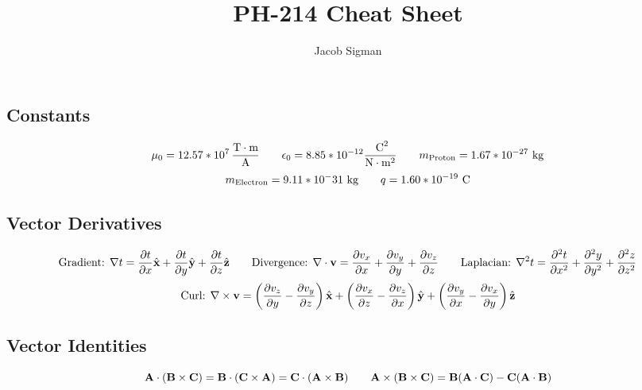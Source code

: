 \documentclass{article}
\title{PH-214 Cheat Sheet}
\author{Jacob Sigman}
\date{}
\begin{document}
\maketitle

\subsection*{Constants}
\[\mu_0=12.57*10^7\,\frac{\textnormal{T}\cdot\textnormal{m}}{\textnormal{A}}\hspace{7 mm}\epsilon_0=8.85*10^{-12}\frac{\textnormal{ C}^2}{\textnormal{N}\cdot\textnormal{m}^2}\hspace{7 mm}m_{\textnormal{Proton}}=1.67*10^{-27}\textnormal{ kg}\]
\[m_{\textnormal{Electron}}=9.11*10^-31\textnormal{ kg}\hspace{7 mm}q=1.60*10^{-19} \textnormal{ C}\]
\subsection*{Vector Derivatives}
\[\textnormal{Gradient: }\nabla t = \frac{\partial t}{\partial x}\hat{\textbf{x}}+\frac{\partial t}{\partial y}\hat{\textbf{y}}+\frac{\partial t}{\partial z}\hat{\textbf{z}}\hspace{7 mm}\textnormal{Divergence: }\nabla\cdot \textbf{v}=\frac{\partial v_x}{\partial x}+\frac{\partial v_y}{\partial y}+\frac{\partial v_z}{\partial z}\hspace{7 mm}\textnormal{Laplacian: }\nabla^2t=\frac{\partial^2t}{\partial x^2}+\frac{\partial^2y}{\partial y^2}+\frac{\partial^2z}{\partial z^2}\]
\[\textnormal{Curl: }\nabla\times \textbf{v} = \left(\frac{\partial v_z}{\partial y}-\frac{\partial v_y}{\partial z}\right)\hat{\textbf{x}}+\left(\frac{\partial v_x}{\partial z}-\frac{\partial v_z}{\partial x}\right)\hat{\textbf{y}}+\left(\frac{\partial v_y}{\partial x}-\frac{\partial v_x}{\partial y}\right)\hat{\textbf{z}}\]
\subsection*{Vector Identities}
\[\textbf{A}\cdot(\textbf{B}\times\textbf{C})=\textbf{B}\cdot(\textbf{C}\times\textbf{A})=\textbf{C}\cdot(\textbf{A}\times\textbf{B})\hspace{7 mm}\textbf{A}\times(\textbf{B}\times\textbf{C})=\textbf{B}(\textbf{A}\cdot\textbf{C})-\textbf{C}(\textbf{A}\cdot\textbf{B})\]
\end{document}
